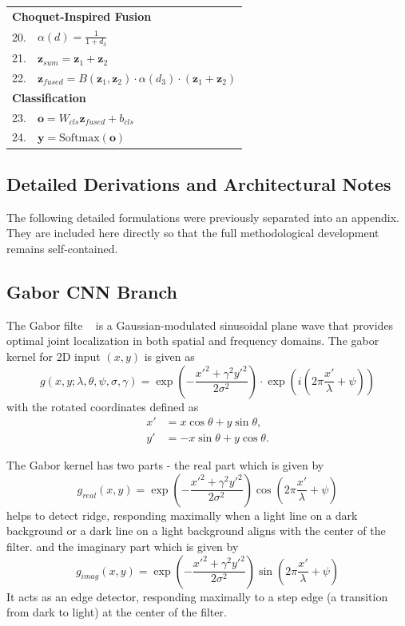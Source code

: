 \documentclass[12pt]{article}
\begin{document}
\begin{table}[!h]
\begin{tabular}{@{}ll@{}}
\midrule
\multicolumn{2}{l}{\textbf{Choquet-Inspired Fusion}} \\

20. & $\alpha(d)=\frac{1}{1+d_3}$ \\
21. & $\mathbf{z}_{sum}=\mathbf{z}_1+\mathbf{z}_2$ \\
22. & $\mathbf{z}_{fused}=B(\mathbf{z}_1,\mathbf{z}_2)\cdot
\alpha(d_3)\cdot (\mathbf{z}_1+\mathbf{z}_2)$ \\

\midrule
\multicolumn{2}{l}{\textbf{Classification}} \\

23. & $\mathbf{o} = W_{cls}\mathbf{z}_{fused} + b_{cls}$ \\
24. & $\mathbf{y} = \text{Softmax}(\mathbf{o})$ \\

\bottomrule
\end{tabular}

\end{table}

\FloatBarrier
\subsection{Detailed Derivations and Architectural Notes}

The following detailed formulations were previously separated into an appendix. They are included here directly so that the full methodological development remains self-contained.

\subsection{Gabor CNN Branch}

The Gabor filte ~\cite{b1} is a Gaussian-modulated sinusoidal plane wave that provides optimal joint localization in both spatial and frequency domains. The gabor kernel for 2D input $(x,y)$ is given as
$$g(x, y; \lambda, \theta, \psi, \sigma, \gamma) = \exp\left(-\frac{x'^2 + \gamma^2 y'^2}{2\sigma^2}\right) \cdot \exp\left(i \left(2\pi \frac{x'}{\lambda} + \psi\right)\right)$$
with the rotated coordinates defined as
\[
\begin{aligned}
x' &= x \cos\theta + y \sin\theta, \\
y' &= -x \sin\theta + y \cos\theta.
\end{aligned}
\]

The Gabor kernel has two parts - the real part which is given by
$$g_{real}(x, y) = \exp\left(-\frac{x'^2 + \gamma^2 y'^2}{2\sigma^2}\right) \cos\left(2\pi \frac{x'}{\lambda} + \psi\right)$$
helps to detect ridge, responding maximally when a light line on a dark background or a dark line on a light background aligns with the center of the filter. 
and the imaginary part which is given by 
$$g_{imag}(x, y) = \exp\left(-\frac{x'^2 + \gamma^2 y'^2}{2\sigma^2}\right) \sin\left(2\pi \frac{x'}{\lambda} + \psi\right)$$
It acts as an edge detector, responding maximally to a step edge (a transition from dark to light) at the center of the filter.
\end{document}

